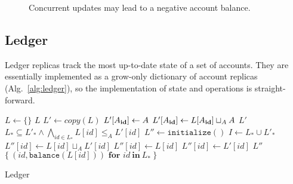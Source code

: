 \documentclass[9pt, oneside]{article}   	%
\begin{document}
\begin{figure}

\caption{Concurrent updates may lead to a negative account balance.}
\label{fig:account-negative-bal}
\end{figure}


\subsection{Ledger}
\label{sec:ledger}

Ledger replicas track the most up-to-date state of a set of accounts. They are essentially implemented as a grow-only dictionary of account replicas (Alg.~\ref{alg:ledger}), so the implementation of state and operations is straight-forward.

\begin{algorithm}
\begin{algorithmic}[1]
    	\State $L \leftarrow \{ \}$ 
    	\State \Return $L$
    \EndFunction
    \State
        \State $L' \leftarrow \textit{copy}(L)$ 
		\State $L'[A_{\scriptsize\textbf{id}}] \leftarrow A$
	\Else
		\State $L'[A_{\scriptsize\textbf{id}}] \leftarrow L[A_{\scriptsize\textbf{id}}] \sqcup_A A$ 
	\EndIf
	\State \Return $L'$
    \EndFunction
    \State
    	\State \Return $L_* \subseteq L'_* \wedge \bigwedge_{id \in L_*} L[id] \leq_A L'[id]$ 
    \EndFunction
    \State
        \State $L'' \leftarrow \texttt{initialize}()$
        \State $I \leftarrow L_* \cup L'_*$
			\State $L''[id] \leftarrow  L[id] \sqcup_A L'[id]$  
			\State $L''[id] \leftarrow L[id]$
		\Else
			\State $L''[id] \leftarrow L'[id]$	
		\EndIf
	\EndFor
	\State \Return $L''$	
    \EndFunction
    \State
        \State \Return $\{~ (\textit{id}, \texttt{balance}(L[id])) \textbf{~for~} id ~\textbf{in}~ L_* ~\}$  
    \EndFunction
\end{algorithmic}
\caption{\label{alg:ledger} Ledger}
\end{algorithm}
\end{document}
